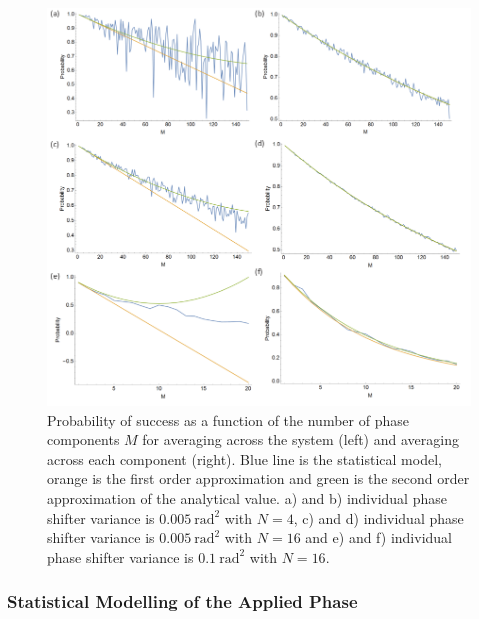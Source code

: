 \documentclass[aps,pra,twocolumn,superscriptaddress,numerical,floatfix]{revtex4-1}
\begin{document}
\begin{figure}
\centerline{\includegraphics[width=\columnwidth]{Psuccess_all.png}}
\caption{Probability of success as a function of the number of phase components $M$ for averaging across the system (left) and averaging across each component (right). Blue line is the statistical model, orange is the first order approximation and green is the second order approximation of the analytical value. a) and b) individual phase shifter variance is $0.005\ \textrm{rad}^{2}$ with $N=4$, c) and d) individual phase shifter variance is $0.005\ \textrm{rad}^{2}$ with $N=16$ and e) and f) individual phase shifter variance is $0.1\ \textrm{rad}^{2}$ with $N=16$. \label{fig:Probability-of-success all}}
\end{figure}



\subsubsection{Statistical Modelling of the Applied Phase\label{Statistical Modelling of the Applied Phase}}
\end{document}
